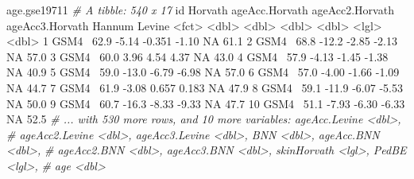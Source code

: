 \documentclass[]{article}
\newcommand{\hlnum}[1]{\textcolor[rgb]{0.816,0.125,0.439}{#1}}%
\newcommand{\hlstr}[1]{\textcolor[rgb]{0.251,0.627,0.251}{#1}}%
\newcommand{\hlcom}[1]{\textcolor[rgb]{0.502,0.502,0.502}{\textit{#1}}}%
\newcommand{\hlopt}[1]{\textcolor[rgb]{0,0,0}{#1}}%
\newcommand{\hlstd}[1]{\textcolor[rgb]{0.251,0.251,0.251}{#1}}%
\newenvironment{Shaded}{\begin{myshaded}}{\end{myshaded}}
\newcommand{\DecValTok}[1]{\hlnum{#1}}
\newcommand{\FloatTok}[1]{\hlnum{#1}}
\newcommand{\StringTok}[1]{\hlstr{#1}}
\newcommand{\CommentTok}[1]{\hlcom{#1}}
\newcommand{\OtherTok}[1]{{#1}}
\newcommand{\OperatorTok}[1]{\hlopt{#1}}
\newcommand{\ErrorTok}[1]{\textcolor{errorcolor}{#1}}
\newcommand{\NormalTok}[1]{\hlstd{#1}}
\begin{document}
\begin{Shaded}
\begin{Highlighting}[]
\NormalTok{age.gse19711}
  \CommentTok{# A tibble: 540 x 17}
\NormalTok{     id    Horvath ageAcc.Horvath ageAcc2.Horvath ageAcc3.Horvath Hannum Levine}
     \OperatorTok{<}\NormalTok{fct}\OperatorTok{>}\StringTok{   }\ErrorTok{<}\NormalTok{dbl}\OperatorTok{>}\StringTok{          }\ErrorTok{<}\NormalTok{dbl}\OperatorTok{>}\StringTok{           }\ErrorTok{<}\NormalTok{dbl}\OperatorTok{>}\StringTok{           }\ErrorTok{<}\NormalTok{dbl}\OperatorTok{>}\StringTok{ }\ErrorTok{<}\NormalTok{lgl}\OperatorTok{>}\StringTok{   }\ErrorTok{<}\NormalTok{dbl}\OperatorTok{>}
\StringTok{   }\DecValTok{1}\NormalTok{ GSM4}\OperatorTok{~}\StringTok{    }\FloatTok{62.9}          \FloatTok{-5.14}          \FloatTok{-0.351}          \FloatTok{-1.10}  \OtherTok{NA}       \FloatTok{61.1}
   \DecValTok{2}\NormalTok{ GSM4}\OperatorTok{~}\StringTok{    }\FloatTok{68.8}         \FloatTok{-12.2}           \FloatTok{-2.85}           \FloatTok{-2.13}  \OtherTok{NA}       \FloatTok{57.0}
   \DecValTok{3}\NormalTok{ GSM4}\OperatorTok{~}\StringTok{    }\FloatTok{60.0}           \FloatTok{3.96}           \FloatTok{4.54}            \FloatTok{4.37}  \OtherTok{NA}       \FloatTok{43.0}
   \DecValTok{4}\NormalTok{ GSM4}\OperatorTok{~}\StringTok{    }\FloatTok{57.9}          \FloatTok{-4.13}          \FloatTok{-1.45}           \FloatTok{-1.38}  \OtherTok{NA}       \FloatTok{40.9}
   \DecValTok{5}\NormalTok{ GSM4}\OperatorTok{~}\StringTok{    }\FloatTok{59.0}         \FloatTok{-13.0}           \FloatTok{-6.79}           \FloatTok{-6.98}  \OtherTok{NA}       \FloatTok{57.0}
   \DecValTok{6}\NormalTok{ GSM4}\OperatorTok{~}\StringTok{    }\FloatTok{57.0}          \FloatTok{-4.00}          \FloatTok{-1.66}           \FloatTok{-1.09}  \OtherTok{NA}       \FloatTok{44.7}
   \DecValTok{7}\NormalTok{ GSM4}\OperatorTok{~}\StringTok{    }\FloatTok{61.9}          \FloatTok{-3.08}           \FloatTok{0.657}           \FloatTok{0.183} \OtherTok{NA}       \FloatTok{47.9}
   \DecValTok{8}\NormalTok{ GSM4}\OperatorTok{~}\StringTok{    }\FloatTok{59.1}         \FloatTok{-11.9}           \FloatTok{-6.07}           \FloatTok{-5.53}  \OtherTok{NA}       \FloatTok{50.0}
   \DecValTok{9}\NormalTok{ GSM4}\OperatorTok{~}\StringTok{    }\FloatTok{60.7}         \FloatTok{-16.3}           \FloatTok{-8.33}           \FloatTok{-9.33}  \OtherTok{NA}       \FloatTok{47.7}
  \DecValTok{10}\NormalTok{ GSM4}\OperatorTok{~}\StringTok{    }\FloatTok{51.1}          \FloatTok{-7.93}          \FloatTok{-6.30}           \FloatTok{-6.33}  \OtherTok{NA}       \FloatTok{52.5}
  \CommentTok{# ... with 530 more rows, and 10 more variables: ageAcc.Levine <dbl>,}
  \CommentTok{#   ageAcc2.Levine <dbl>, ageAcc3.Levine <dbl>, BNN <dbl>, ageAcc.BNN <dbl>,}
  \CommentTok{#   ageAcc2.BNN <dbl>, ageAcc3.BNN <dbl>, skinHorvath <lgl>, PedBE <lgl>,}
  \CommentTok{#   age <dbl>}
\end{Highlighting}
\end{Shaded}
\end{document}
